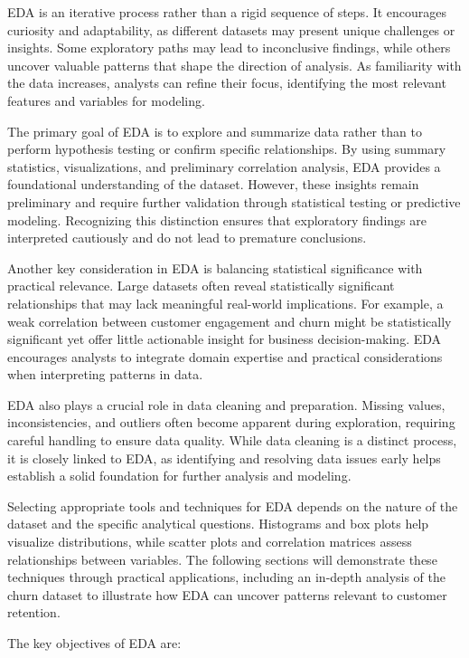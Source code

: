 \documentclass[
  11pt,
]{book}
\theoremstyle{definition}
\theoremstyle{definition}
\theoremstyle{definition}
\theoremstyle{definition}
\theoremstyle{remark}
\begin{document}
EDA is an iterative process rather than a rigid sequence of steps. It encourages curiosity and adaptability, as different datasets may present unique challenges or insights. Some exploratory paths may lead to inconclusive findings, while others uncover valuable patterns that shape the direction of analysis. As familiarity with the data increases, analysts can refine their focus, identifying the most relevant features and variables for modeling.

The primary goal of EDA is to explore and summarize data rather than to perform hypothesis testing or confirm specific relationships. By using summary statistics, visualizations, and preliminary correlation analysis, EDA provides a foundational understanding of the dataset. However, these insights remain preliminary and require further validation through statistical testing or predictive modeling. Recognizing this distinction ensures that exploratory findings are interpreted cautiously and do not lead to premature conclusions.

Another key consideration in EDA is balancing statistical significance with practical relevance. Large datasets often reveal statistically significant relationships that may lack meaningful real-world implications. For example, a weak correlation between customer engagement and churn might be statistically significant yet offer little actionable insight for business decision-making. EDA encourages analysts to integrate domain expertise and practical considerations when interpreting patterns in data.

EDA also plays a crucial role in data cleaning and preparation. Missing values, inconsistencies, and outliers often become apparent during exploration, requiring careful handling to ensure data quality. While data cleaning is a distinct process, it is closely linked to EDA, as identifying and resolving data issues early helps establish a solid foundation for further analysis and modeling.

Selecting appropriate tools and techniques for EDA depends on the nature of the dataset and the specific analytical questions. Histograms and box plots help visualize distributions, while scatter plots and correlation matrices assess relationships between variables. The following sections will demonstrate these techniques through practical applications, including an in-depth analysis of the churn dataset to illustrate how EDA can uncover patterns relevant to customer retention.

The key objectives of EDA are:
\end{document}
